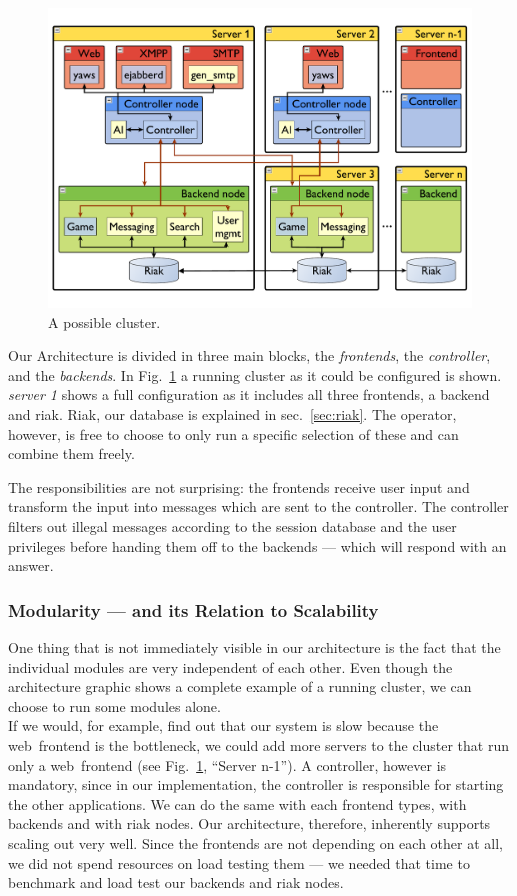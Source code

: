 \documentclass[11pt,a4paper]{report}
\begin{document}
\begin{figure}[h]
 \centering
 \includegraphics[width=13cm]{./graphics/arch.pdf}
 \caption{A possible cluster.}
 \label{fig:arch}
\end{figure}

Our Architecture is divided in three main blocks, the {\em frontends}, the
{\em controller}, and the {\em backends}. In Fig.~\ref{fig:arch} a running
cluster as it could be configured is shown. {\em server 1} shows a full
configuration as it includes all three frontends, a backend and riak. Riak, our
database is explained in sec.~\ref{sec:riak}.
The operator, however, is free to choose to only run a specific selection of
these and can combine them freely.

The responsibilities are not surprising: the frontends receive user input and
transform the input into messages which are sent to the controller.
The controller filters out illegal messages according to the session database
and the user privileges before handing them off to the backends --- which will
respond with an answer.

\subsubsection{Modularity --- and its Relation to Scalability}
One thing that is not immediately visible in our architecture is the fact that
the individual modules are very independent of each other. Even though the
architecture graphic shows a complete example of a running cluster, we can
choose to run some modules alone. \\
If we would, for example, find out that our system is slow because the
web~frontend is the bottleneck, we could add more servers to the cluster that
run only a web~frontend (see Fig.~\ref{fig:arch}, ``Server n-1'').
A controller, however is mandatory, since in our implementation, the controller
is responsible for starting the other applications.
We can do the same with each frontend types, with backends and with riak nodes.
Our architecture, therefore, inherently supports scaling out very well.
Since the frontends are not depending on each other at all, we did not spend
resources on load testing them --- we needed that
time to benchmark and load test our backends and riak nodes.
\end{document}
